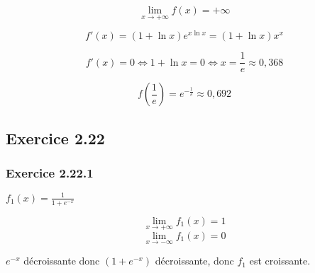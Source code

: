 \documentclass{report}
\begin{document}
\begin{displaymath}
	\lim_{x \rightarrow +\infty} f(x) = +\infty
\end{displaymath}

\begin{displaymath}
	f'(x) = (1+ \ln x)e^{x \ln x} = (1+ \ln x)x^x
\end{displaymath}

\begin{displaymath}
	f'(x) = 0 \Longleftrightarrow 1 + \ln x = 0 \Longleftrightarrow x = \frac{1}{e} \approx 0,368
\end{displaymath}

\begin{displaymath}
	f\left(\frac{1}{e}\right) = e^{-\frac{1}{e}} \approx 0,692
\end{displaymath}



\subsection*{Exercice 2.22}

\subsubsection*{Exercice 2.22.1}

$f_1(x) = \frac{1}{1+e^{-x}}$

\begin{displaymath}
	\lim_{x \rightarrow +\infty} f_1(x) = 1
\end{displaymath}
\begin{displaymath}
	\lim_{x \rightarrow -\infty} f_1(x) = 0
\end{displaymath}

$e^{-x}$ décroissante donc $(1+e^{-x})$ décroissante, donc $f_1$ est croissante.
\end{document}
